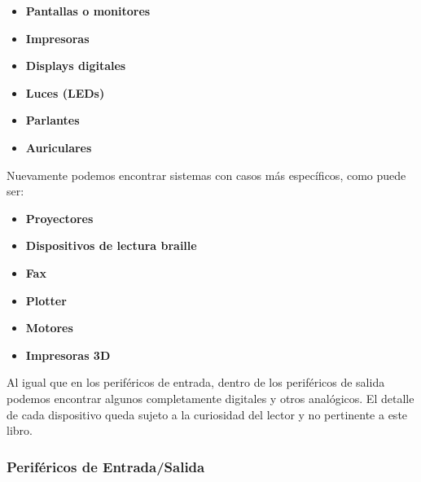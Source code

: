 \begin{minipage}{0.45\textwidth}
    \begin{itemize}
        \item \textbf{Pantallas o monitores}
        \item \textbf{Impresoras}
        \item \textbf{Displays digitales}
    \end{itemize}
\end{minipage}
\begin{minipage}{0.45\textwidth}
    \begin{itemize}
        \item \textbf{Luces (LEDs)}
        \item \textbf{Parlantes}
        \item \textbf{Auriculares}
    \end{itemize}
\end{minipage}

Nuevamente podemos encontrar sistemas con casos más específicos, como puede ser:

\begin{minipage}{0.45\textwidth}
    \begin{itemize}
        \item \textbf{Proyectores}
        \item \textbf{Dispositivos de lectura braille}
        \item \textbf{Fax}
    \end{itemize}
\end{minipage}
\begin{minipage}{0.45\textwidth}
    \begin{itemize}
        \item \textbf{Plotter}
        \item \textbf{Motores}
        \item \textbf{Impresoras 3D}
    \end{itemize}
\end{minipage}

Al igual que en los periféricos de entrada, dentro de los periféricos de
salida podemos encontrar algunos completamente digitales y otros analógicos.
El detalle de cada dispositivo queda sujeto a la curiosidad del lector y no
pertinente a este libro. 

\subsubsection*{Periféricos de Entrada/Salida}

